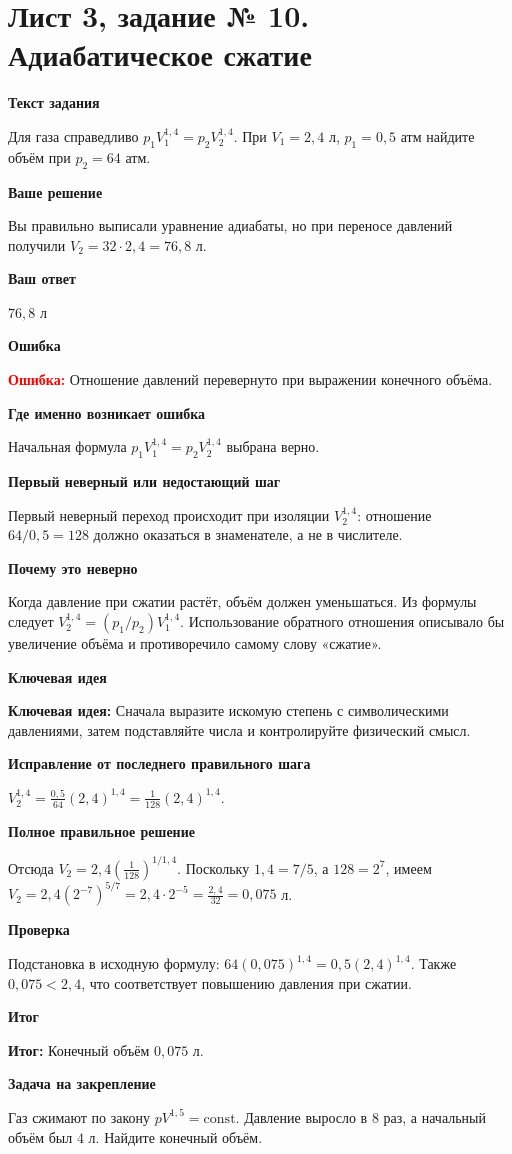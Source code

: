 \documentclass[11pt,a4paper]{article}
\newcommand{\Idea}{\textcolor{blue!60!black}{\textbf{Ключевая идея:}}}
\newcommand{\Res}{\textcolor{teal!60!black}{\textbf{Итог:}}}
\newcommand{\Heading}[2]{\par\medskip\textbf{#1}\par#2\par}
\begin{document}
\section*{Лист 3, задание № 10. Адиабатическое сжатие}
\Heading{Текст задания}{Для газа справедливо $p_1V_1^{1{,}4}=p_2V_2^{1{,}4}$. При $V_1=2{,}4$ л, $p_1=0{,}5$ атм найдите объём при $p_2=64$ атм.}
\Heading{Ваше решение}{Вы правильно выписали уравнение адиабаты, но при переносе давлений получили $V_2=32\cdot2{,}4=76{,}8$ л.}
\Heading{Ваш ответ}{$76{,}8$ л}
\Heading{Ошибка}{\textcolor{red}{\textbf{Ошибка:}} Отношение давлений перевернуто при выражении конечного объёма.}
\Heading{Где именно возникает ошибка}{Начальная формула $p_1V_1^{1{,}4}=p_2V_2^{1{,}4}$ выбрана верно.}
\Heading{Первый неверный или недостающий шаг}{Первый неверный переход происходит при изоляции $V_2^{1{,}4}$: отношение $64/0{,}5=128$ должно оказаться в знаменателе, а не в числителе.}
\Heading{Почему это неверно}{Когда давление при сжатии растёт, объём должен уменьшаться. Из формулы следует $V_2^{1{,}4}=(p_1/p_2)V_1^{1{,}4}$. Использование обратного отношения описывало бы увеличение объёма и противоречило самому слову «сжатие».}
\Heading{Ключевая идея}{\Idea{} Сначала выразите искомую степень с символическими давлениями, затем подставляйте числа и контролируйте физический смысл.}
\Heading{Исправление от последнего правильного шага}{$V_2^{1{,}4}=\frac{0{,}5}{64}(2{,}4)^{1{,}4}=\frac1{128}(2{,}4)^{1{,}4}$.}
\Heading{Полное правильное решение}{Отсюда $V_2=2{,}4\left(\frac1{128}\right)^{1/1{,}4}$. Поскольку $1{,}4=7/5$, а $128=2^7$, имеем $V_2=2{,}4(2^{-7})^{5/7}=2{,}4\cdot2^{-5}=\frac{2{,}4}{32}=0{,}075$ л.}
\Heading{Проверка}{Подстановка в исходную формулу: $64(0{,}075)^{1{,}4}=0{,}5(2{,}4)^{1{,}4}$. Также $0{,}075<2{,}4$, что соответствует повышению давления при сжатии.}
\Heading{Итог}{\Res{} Конечный объём $0{,}075$ л.}
\Heading{Задача на закрепление}{Газ сжимают по закону $pV^{1{,}5}=\mathrm{const}$. Давление выросло в $8$ раз, а начальный объём был $4$ л. Найдите конечный объём.}
\newpage
{}\label{task:3_14}
\end{document}
